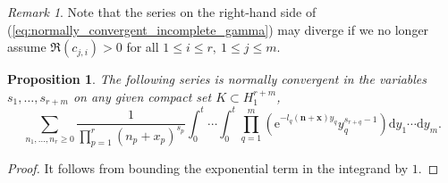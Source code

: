 \documentclass[a4paper]{amsart}
\newtheorem{proposition}[theorem]{Proposition}
\theoremstyle{remark}
\newtheorem{remark}[theorem]{Remark}
\theoremstyle{definition}
\newcommand{\dd}{\mathrm{d}}
\newcommand{\phie}{\mathrm{e}}
\begin{document}
\begin{remark}
Note that the series on the right-hand side of (\ref{eq:normally_convergent_incomplete_gamma}) may diverge if we no longer assume $\Re(c_{j,i})>0$ for all $1 \leq i \leq r, \ 1 \leq j \leq m$.
\end{remark}

\begin{proposition}
\label{prop:normally_convergent_H1}
The following series is normally convergent in the variables $s_1,\ldots,s_{r+m}$ on any given compact set $K \subset H_1^{r+m}$,
$$ \sum_{n_1,\ldots,n_r \geq 0} \frac{1}{\prod_{p=1}^r (n_p+x_p)^{s_p}} \int_{0}^{t} \cdots \int_{0}^{t} \prod_{q=1}^m \left( \phie^{-l_q(\mathbf{n}+\mathbf{x})y_q} y_q^{s_{r+q}-1} \right) \dd y_1 \cdots \dd y_m. $$
\end{proposition}

\begin{proof}
It follows from bounding the exponential term in the integrand by $1$.
\end{proof}
\end{document}
